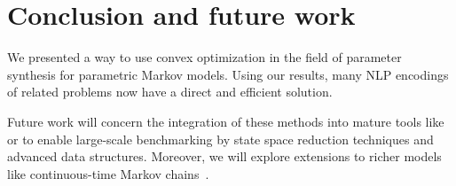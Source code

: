\section{Conclusion and future work}\label{sec:conclusion}
We presented a way to use convex optimization in the field of parameter synthesis for parametric Markov models. Using our results, many NLP encodings of related problems now have a direct and efficient solution.

Future work will concern the integration of these methods into mature tools like  or  to enable large-scale benchmarking by state space reduction techniques and advanced data structures. Moreover, we will explore extensions to richer models like continuous-time Markov chains~\cite{katoen2016probabilistic}.
